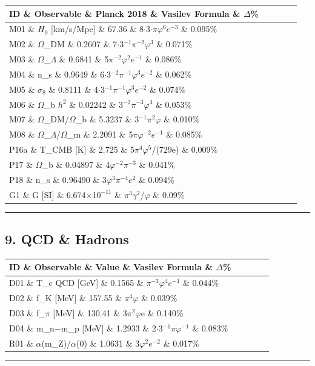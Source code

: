\begin{tabular}{|l|l|l|l|l|}
\hline
ID \& Observable \& Planck 2018 \& Vasilev Formula \& $\Delta$\% \\
\hline
M01 \& $H_{0}$ [km/s/Mpc] \& 67.36 \& 8$\cdot$3$\cdot\pi\varphi^{6}$$e^{-3}$ \& 0.095\% \\
M02 \& $\Omega$\_DM \& 0.2607 \& 7$\cdot$3$^{-1}\pi^{-2}\varphi^{3}$ \& 0.071\% \\
M03 \& $\Omega$\_$\Lambda$ \& 0.6841 \& 5$\pi^{-2}\varphi^{2}$$e^{-1}$ \& 0.086\% \\
M04 \& n\_s \& 0.9649 \& 6$\cdot$3$^{-2}\pi^{-1}\varphi^{3}$$e^{-2}$ \& 0.062\% \\
M05 \& $\sigma_{8}$ \& 0.8111 \& 4$\cdot$3$^{-1}\pi^{-1}\varphi^{3}$$e^{-2}$ \& 0.074\% \\
M06 \& $\Omega$\_b $h^{2}$ \& 0.02242 \& 3$^{-2}\pi^{-3}\varphi^{3}$ \& 0.053\% \\
M07 \& $\Omega$\_DM/$\Omega$\_b \& 5.3237 \& 3$^{-1}\pi^{2}\varphi$ \& 0.010\% \\
M08 \& $\Omega$\_$\Lambda$/$\Omega$\_m \& 2.2091 \& 5$\pi\varphi^{-2}$$e^{-1}$ \& 0.085\% \\
P16a \& T\_CMB [K] \& 2.725 \& 5$\pi^{4}\varphi^{5}$/(729e) \& 0.009\% \\
P17 \& $\Omega$\_b \& 0.04897 \& 4$\varphi^{-2}\pi^{-3}$ \& 0.041\% \\
P18 \& n\_s \& 0.96490 \& 3$\varphi^{3}\pi^{-4}$$e^{2}$ \& 0.094\% \\
G1 \& G [SI] \& 6.674$\times$1$0^{-11}$ \& $\pi^{3}\gamma^{2}$/$\varphi$ \& 0.09\% \\
\hline
\end{tabular}
\noindent\rule{\textwidth}{0.4pt}

\subsection{9. QCD \& Hadrons}

\begin{tabular}{|l|l|l|l|l|}
\hline
ID \& Observable \& Value \& Vasilev Formula \& $\Delta$\% \\
\hline
D01 \& T\_c QCD [GeV] \& 0.1565 \& $\pi^{-3}\varphi^{4}$$e^{-1}$ \& 0.044\% \\
D02 \& f\_K [MeV] \& 157.55 \& $\pi^{4}\varphi$ \& 0.039\% \\
D03 \& f\_$\pi$ [MeV] \& 130.41 \& 3$\pi^{2}\varphi$e \& 0.140\% \\
D04 \& m\_n$-$m\_p [MeV] \& 1.2933 \& 2$\cdot$3$^{-1}\pi\varphi^{-1}$ \& 0.083\% \\
R01 \& $\alpha$(m\_Z)/$\alpha$(0) \& 1.0631 \& 3$\varphi^{2}$$e^{-2}$ \& 0.017\% \\
\hline
\end{tabular}
\noindent\rule{\textwidth}{0.4pt}


